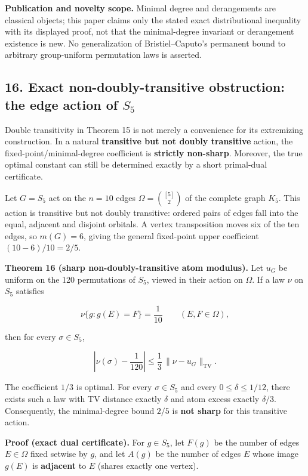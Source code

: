 \documentclass[
  11pt,
]{article}
\begin{document}
\textbf{Publication and novelty scope.} Minimal degree and derangements
are classical objects; this paper claims only the stated exact
distributional inequality with its displayed proof, not that the
minimal-degree invariant or derangement existence is new. No
generalization of Bristiel--Caputo's permanent bound to arbitrary
group-uniform permutation laws is asserted.

\subsection{\texorpdfstring{16. Exact non-doubly-transitive obstruction:
the edge action of
\(S_5\)}{16. Exact non-doubly-transitive obstruction: the edge action of S\_5}}\label{exact-non-doubly-transitive-obstruction-the-edge-action-of-s_5}

Double transitivity in Theorem 15 is not merely a convenience for its
extremizing construction. In a natural \textbf{transitive but not doubly
transitive} action, the fixed-point/minimal-degree coefficient is
\textbf{strictly non-sharp}. Moreover, the true optimal constant can
still be determined exactly by a short primal-dual certificate.

Let \(G=S_5\) act on the \(n=10\) edges \(\Omega=\binom{[5]}2\) of the
complete graph \(K_5\). This action is transitive but not doubly
transitive: ordered pairs of edges fall into the equal, adjacent and
disjoint orbitals. A vertex transposition moves six of the ten edges, so
\(m(G)=6\), giving the general fixed-point upper coefficient
\((10-6)/10=2/5\).

\textbf{Theorem 16 (sharp non-doubly-transitive atom modulus).} Let
\(u_G\) be uniform on the 120 permutations of \(S_5\), viewed in their
action on \(\Omega\). If a law \(\nu\) on \(S_5\) satisfies

\[
\nu\{g:g(E)=F\}=\frac1{10}\qquad(E,F\in\Omega),
\]

then for every \(\sigma\in S_5\),

\[
\boxed{\left|\nu(\sigma)-\frac1{120}\right|
\le\frac13\,\|\nu-u_G\|_{\mathrm{TV}}.} \tag{60}
\]

The coefficient \(1/3\) is optimal. For every \(\sigma\in S_5\) and
every \(0\le\delta\le1/12\), there exists such a law with TV distance
exactly \(\delta\) and atom excess exactly \(\delta/3\). Consequently,
the minimal-degree bound \(2/5\) is \textbf{not sharp} for this
transitive action.

\textbf{Proof (exact dual certificate).} For \(g\in S_5\), let \(F(g)\)
be the number of edges \(E\in\Omega\) fixed setwise by \(g\), and let
\(A(g)\) be the number of edges \(E\) whose image \(g(E)\) is
\textbf{adjacent} to \(E\) (shares exactly one vertex).
\end{document}
